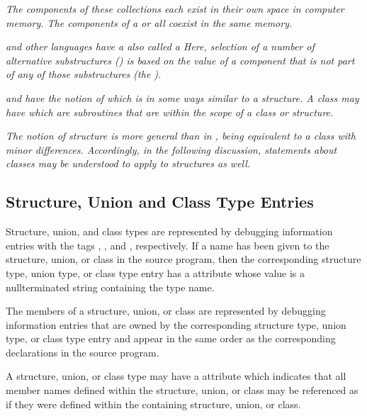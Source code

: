 \textit{The components of these collections each exist in their
own space in computer memory. The components of a  or 
 all coexist in the same memory.}

\textit{ and 
other languages have a 
also called a  Here, selection of a
number of alternative substructures () is based
on the value of a component that is not part of any of those
substructures (the ).}

\textit{ and 
 have the notion of  which is in some
ways similar to a structure. A class may have  which are subroutines that are within the scope
of a class or structure.}

\textit{The  notion of 
structure is more general than in , being
equivalent to a class with minor differences. Accordingly,
in the following discussion, statements about 
 classes may
be understood to apply to  structures as well.}

\subsection{Structure, Union and Class Type Entries}
\label{chap:structureunionandclasstypeentries}
Structure, union, and class types are represented by debugging
information entries 
with 
the tags 
\DWTAGstructuretypeTARG,
\DWTAGuniontypeTARG, 
and \DWTAGclasstypeTARG,
respectively. If a name has been given to the structure,
union, or class in the source program, then the corresponding
structure type, union type, or class type entry has a
\DWATname{} attribute 
whose value is a null\dash terminated string
containing the type name.
\bbeb

The members of a structure, union, or class are represented
by debugging information entries that are owned by the
corresponding structure type, union type, or class type entry
and appear in the same order as the corresponding declarations
in the source program.

A structure, union, or class type may have a \DWATexportsymbolsDEFN{}
attribute 
which indicates that all member names defined within 
the structure, union, or class may be referenced as if they were
defined within the containing structure, union, or class. 


